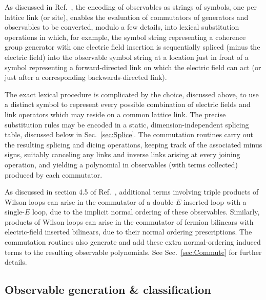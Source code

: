 \documentclass [12pt]{article}
\begin{document}
As discussed in Ref.~\cite{CSVAII}, the encoding of observables
as strings of symbols, one per lattice link (or site), enables
the evaluation of commutators of generators and observables
to be converted, modulo a few details,
into lexical substitution operations in which, for example,
the symbol string representing a coherence group generator
with one electric field insertion
is sequentially spliced (minus the electric field)
into the observable symbol string at a location
just in front of a symbol representing a forward-directed
link on which the electric field can act
(or just after a corresponding backwards-directed link).

The exact lexical procedure is complicated by the choice,
discussed above, to use a distinct symbol to represent
every possible combination of electric fields and link
operators which may reside on a common lattice link.
The precise substitution rules may be encoded
in a static, dimension-independent splicing table,
discussed below in Sec.~\ref{sec:Splice}.
The commutation routines
carry out the resulting splicing and dicing operations,
keeping track of the associated minus signs,
suitably canceling any links and inverse links
arising at every joining operation, and yielding
a polynomial in observables (with terms collected)
produced by each commutator.

As discussed in section 4.5 of Ref.~\cite{CSVAII}, additional
terms involving triple products of Wilson loops can arise
in the commutator of a double-$E$ inserted loop with
a single-$E$ loop, due to the implicit normal ordering
of these observables.
Similarly, products of Wilson loops can arise in the
commutator of fermion bilinears with electric-field inserted
bilinears, due to their normal ordering prescriptions.
The commutation routines also generate and
add these extra normal-ordering induced terms
to the resulting observable polynomials.
See Sec.~\ref{sec:Commute} for further details.

\subsection {Observable generation \& classification}
\end{document}
